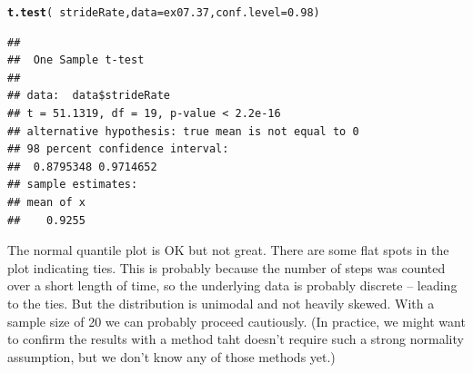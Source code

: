\documentclass[twoside]{book}\usepackage[]{graphicx}\usepackage[]{xcolor}
\makeatletter
\newcommand{\hlnum}[1]{\textcolor[rgb]{0.686,0.059,0.569}{#1}}%
\newcommand{\hlopt}[1]{\textcolor[rgb]{0,0,0}{#1}}%
\newcommand{\hlstd}[1]{\textcolor[rgb]{0.345,0.345,0.345}{#1}}%
\newcommand{\hlkwc}[1]{\textcolor[rgb]{0.333,0.667,0.333}{#1}}%
\newcommand{\hlkwd}[1]{\textcolor[rgb]{0.737,0.353,0.396}{\textbf{#1}}}%
\newenvironment{kframe}{%
 \def\at@end@of@kframe{}%
 \ifinner\ifhmode%
  \def\at@end@of@kframe{\end{minipage}}%
  \begin{minipage}{\columnwidth}%
 \fi\fi%
 \def\FrameCommand##1{\hskip\@totalleftmargin \hskip-\fboxsep
 \colorbox{shadecolor}{##1}\hskip-\fboxsep
     \hskip-\linewidth \hskip-\@totalleftmargin \hskip\columnwidth}%
 \MakeFramed {\advance\hsize-\width
   \@totalleftmargin\z@ \linewidth\hsize
   \@setminipage}}%
 {\par\unskip\endMakeFramed%
 \at@end@of@kframe}
\newenvironment{knitrout}{}{} %
\makeatother
\begin{document}
\begin{solution}
\begin{knitrout}
\color{fgcolor}\begin{kframe}
\begin{alltt}
\hlkwd{t.test}\hlstd{(}\hlopt{~}\hlstd{strideRate,} \hlkwc{data} \hlstd{= ex07.37,} \hlkwc{conf.level} \hlstd{=} \hlnum{0.98}\hlstd{)}
\end{alltt}
\begin{verbatim}
## 
## 	One Sample t-test
## 
## data:  data$strideRate
## t = 51.1319, df = 19, p-value < 2.2e-16
## alternative hypothesis: true mean is not equal to 0
## 98 percent confidence interval:
##  0.8795348 0.9714652
## sample estimates:
## mean of x 
##    0.9255
\end{verbatim}
\end{kframe}
\end{knitrout}
	The normal quantile plot is OK but not great.  There are some flat spots in
	the plot indicating ties.  This is probably because the number of steps was
	counted over a short length of time, so the underlying data is probably
	discrete -- leading to the ties.  But the distribution is unimodal and 
	not heavily skewed.  With a sample size of 20 we can probably proceed 
	cautiously.  (In practice, we might want to confirm the results with a method
	taht doesn't require such a strong normality assumption, but we don't know
	any of those methods yet.)
\end{solution}
\end{document}
